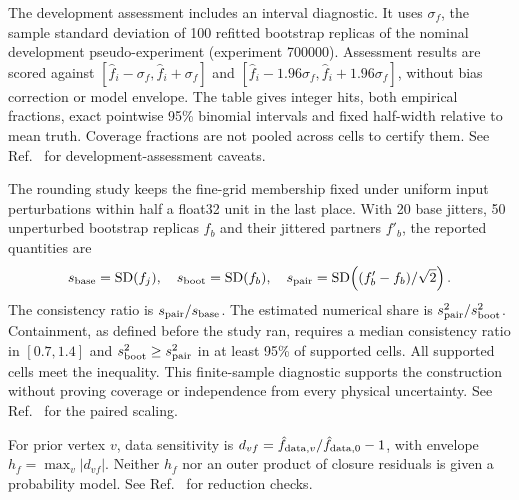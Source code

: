The development assessment includes an interval diagnostic. It uses $\sigma_f$, the sample standard deviation of 100 refitted bootstrap replicas of the nominal development pseudo-experiment (experiment 700000). Assessment results are scored against $[\hat f_i-\sigma_f,\hat f_i+\sigma_f]$ and $[\hat f_i-1.96\sigma_f,\hat f_i+1.96\sigma_f]$, without bias correction or model envelope. The table gives integer hits, both empirical fractions, exact pointwise 95\% binomial intervals and fixed half-width relative to mean truth. Coverage fractions are not pooled across cells to certify them. See Ref.~\cite{NoteRecords2026} for development-assessment caveats.

The rounding study keeps the fine-grid membership fixed under uniform input perturbations within half a float32 unit in the last place. With 20 base jitters, 50 unperturbed bootstrap replicas $f_b$ and their jittered partners $f'_b$, the reported quantities are
\begin{equation}
 s_{\rm base}=\operatorname{SD}(f_j),\quad
 s_{\rm boot}=\operatorname{SD}(f_b),\quad
 s_{\rm pair}=\operatorname{SD}\!\left((f'_b-f_b)/\sqrt2\right).
\end{equation}
The consistency ratio is $s_{\rm pair}/s_{\rm base}$. The estimated numerical share is $s_{\rm pair}^2/s_{\rm boot}^2$. Containment, as defined before the study ran, requires a median consistency ratio in $[0.7,1.4]$ and $s_{\rm boot}^2\geq s_{\rm pair}^2$ in at least 95\% of supported cells. All supported cells meet the inequality. This finite-sample diagnostic supports the construction without proving coverage or independence from every physical uncertainty. See Ref.~\cite{NoteRecords2026} for the paired scaling.

For prior vertex $v$, data sensitivity is $d_{vf}=\hat f_{{\rm data},v}/\hat f_{{\rm data},0}-1$, with envelope $h_f=\max_v|d_{vf}|$. Neither $h_f$ nor an outer product of closure residuals is given a probability model. See Ref.~\cite{NoteRecords2026} for reduction checks.

